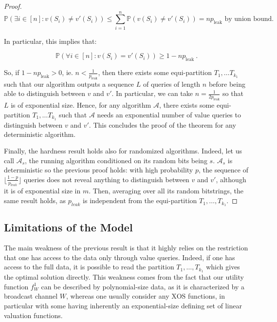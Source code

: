 \begin{proof}
    \[ \mathbb{P}\left( \exists i \in [n] : v(S_i) \not= v'(S_i) \right) \leq \sum_{i=1}^n\mathbb{P}\left(v(S_i) \not= v'(S_i) \right) = np_{\text{leak}} \text{ by union bound.}\]

    In particular, this implies that:

    \[ \mathbb{P}\left( \forall i \in [n] : v(S_i) = v'(S_i) \right) \geq 1 - np_{\text{leak}} \ . \]

    So, if $1 - np_{\text{leak}} > 0$, ie. $n < \frac{1}{p_{\text{leak}}}$, then there exists some equi-partition $T_1, \ldots T_{k_1}$ such that our algorithm outputs a sequence $L$ of queries of length $n$ before being able to distinguish between $v$ and $v'$. In particular, we can take $n = \frac{1}{2p_{\text{leak}}}$ so that $L$ is of exponential size. Hence, for any algorithm $\mathcal{A}$, there exists some equi-partition $T_1, \ldots T_{k_1}$ such that $\mathcal{A}$ needs an exponential number of value queries to distinguish between $v$ and $v'$. This concludes the proof of the theorem for any deterministic algorithm.

    Finally, the hardness result holds also for randomized algorithms. Indeed, let us call $\mathcal{A}_s$, the running algorithm conditioned on its random bits being $s$. $\mathcal{A}_s$ is deterministic so the previous proof holds: with high probability $p$, the sequence of $\lfloor\frac{1-p}{p_{leak}}\rfloor$ queries does not reveal anything to distinguish between $v$ and $v'$, although it is of exponential size in $m$. Then, averaging over all its random bitstrings, the same result holds, as $p_{leak}$ is independent from the equi-partition $T_1, \ldots, T_{k_1}$.
\end{proof}

\subsection{Limitations of the Model}
The main weakness of the previous result is that it highly relies on the restriction that one has access to the data only through value queries. Indeed, if one has access to the full data, it is possible to read the partition $T_1, \ldots, T_{k_1}$ which gives the optimal solution directly. This weakness comes from the fact that our utility function $f_W^1$ can be described by polynomial-size data, as it is characterized by a broadcast channel $W$, whereas one usually consider any $\textrm{XOS}$ functions, in particular with some having inherently an exponential-size defining set of linear valuation functions.

